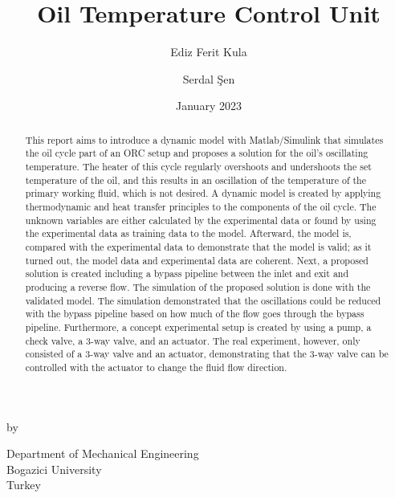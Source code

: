 \documentclass[a4paper]{report} %
\title{Oil Temperature Control Unit}
\author{Ediz Ferit Kula \and Serdal Şen}
\date{January 2023}
\begin{document}

    \begin{titlepage}
        \begin{center}
            \vspace*{1cm}

    
            \LARGE
            \thetitle
            
            \Large
            \vspace{0.5cm}
            
            by
            
            \vspace{0.5cm}
            \theauthor
            
            \vfill
            
            \vspace{0.8cm}
            
            
            \Large
            Department of Mechanical Engineering\\
            Bogazici University\\
            Turkey\\
            \thedate
            \vspace*{1cm}
        \end{center}
    \end{titlepage}

    \begin{abstract}
         This report aims to introduce a dynamic model with Matlab/Simulink that simulates the oil cycle part of an ORC setup and proposes a solution for the oil's oscillating temperature. The heater of this cycle regularly overshoots and undershoots the set temperature of the oil, and this results in an oscillation of the temperature of the primary working fluid, which is not desired. A dynamic model is created by applying thermodynamic and heat transfer principles to the components of the oil cycle. The unknown variables are either calculated by the experimental data or found by using the experimental data as training data to the model. Afterward, the model is, compared with the experimental data to demonstrate that the model is valid; as it turned out, the model data and experimental data are coherent. Next, a proposed solution is created including a bypass pipeline between the inlet and exit and producing a reverse flow. The simulation of the proposed solution is done with the validated model. The simulation demonstrated that the oscillations could be reduced with the bypass pipeline based on how much of the flow goes through the bypass pipeline. Furthermore, a concept experimental setup is created by using a pump, a check valve, a 3-way valve, and an actuator. The real experiment, however, only consisted of a 3-way valve and an actuator, demonstrating that the 3-way valve can be controlled with the actuator to change the fluid flow direction.
    \end{abstract}
   
\end{document}
